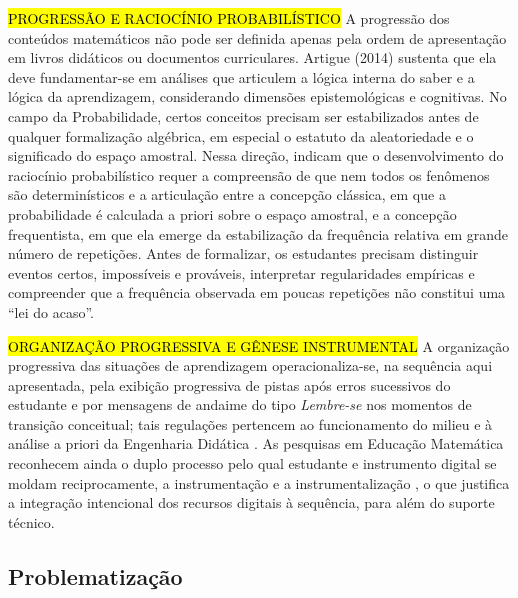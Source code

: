 {\hl {PROGRESSÃO E RACIOCÍNIO PROBABILÍSTICO} A progressão dos conteúdos matemáticos não pode ser definida apenas pela ordem de apresentação em livros didáticos ou documentos curriculares. Artigue (2014) sustenta que ela deve fundamentar-se em análises que articulem a lógica interna do saber e a lógica da aprendizagem, considerando dimensões epistemológicas e cognitivas. No campo da Probabilidade, certos conceitos precisam ser estabilizados antes de qualquer formalização algébrica, em especial o estatuto da aleatoriedade e o significado do espaço amostral. Nessa direção,  indicam que o desenvolvimento do raciocínio probabilístico requer a compreensão de que nem todos os fenômenos são determinísticos e a articulação entre a concepção clássica, em que a probabilidade é calculada a priori sobre o espaço amostral, e a concepção frequentista, em que ela emerge da estabilização da frequência relativa em grande número de repetições. Antes de formalizar, os estudantes precisam distinguir eventos certos, impossíveis e prováveis, interpretar regularidades empíricas e compreender que a frequência observada em poucas repetições não constitui uma ``lei do acaso''.

\hl {ORGANIZAÇÃO PROGRESSIVA E GÊNESE INSTRUMENTAL} A organização progressiva das situações de aprendizagem operacionaliza-se, na sequência aqui apresentada, pela exibição progressiva de pistas após erros sucessivos do estudante e por mensagens de andaime do tipo \emph{Lembre-se} nos momentos de transição conceitual; tais regulações pertencem ao funcionamento do milieu \cite{brousseau2002} e à análise a priori da Engenharia Didática \cite{artigue2014}. As pesquisas em Educação Matemática reconhecem ainda o duplo processo pelo qual estudante e instrumento digital se moldam reciprocamente, a instrumentação e a instrumentalização \cite{trouche2004}, o que justifica a integração intencional dos recursos digitais à sequência, para além do suporte técnico.

\subsection{Problematização}

}

